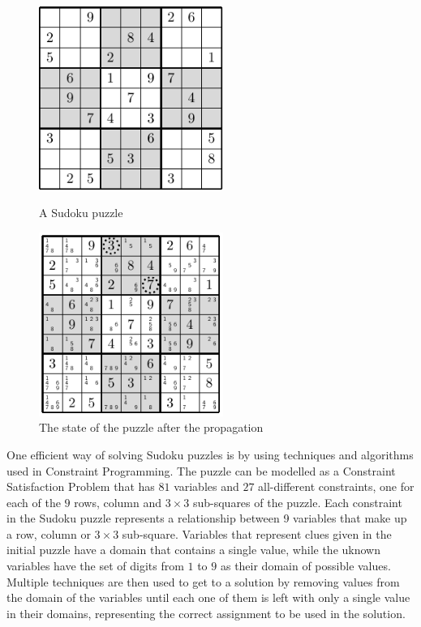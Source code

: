 \documentclass{l4proj}
\begin{document}
\begin{figure}[H]
\begin{center}
\begin{minipage}{6cm}
\includegraphics[height=6cm]{sudokugrid.pdf}
\caption{A Sudoku puzzle}
\label{sudokugrid1}
\end{minipage}%
\hspace{2.5cm}
\begin{minipage}{6cm}
\includegraphics[trim=0.075cm 0.075cm 0.075cm 0.075cm, height=6cm]{sudokugrid2.pdf}
\caption{The state of the puzzle after the propagation}
\label{sudokugrid2}
\end{minipage}%
\end{center}
\end{figure}

\vspace{-1cm}

\noindent One efficient way of solving Sudoku puzzles is by using techniques and algorithms used in Constraint Programming. The puzzle can be modelled as a Constraint Satisfaction Problem that has $81$ variables and $27$ all-different constraints, one for each of the $9$ rows, column and $3\times 3$ sub-squares of the puzzle. Each constraint in the Sudoku puzzle represents a relationship between 9 variables that make up a row, column or $3\times 3$ sub-square. Variables that represent clues given in the initial puzzle have a domain that contains a single value, while the uknown variables have the set of digits from $1$ to $9$ as their domain of possible values. Multiple techniques are then used to get to a solution by removing values from the domain of the variables until each one of them is left with only a single value in their domains, representing the correct assignment to be used in the solution.
\end{document}
